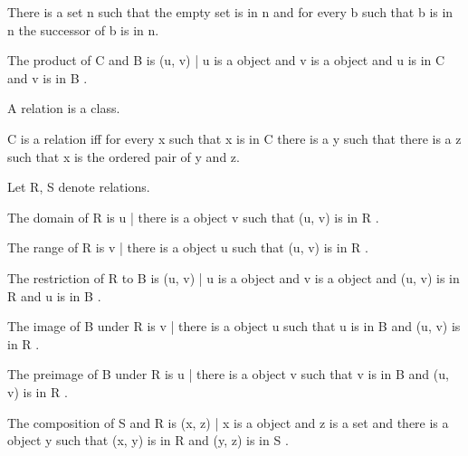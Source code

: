 \documentclass{article}
\begin{document}
\begin{forthel}
    \begin{axiom}[Inf]
      There is a set n such that the empty set is in n and for every b
        such that b is in n the successor of b is in n.
    \end{axiom}

    \begin{definition}
      The product of C and B is { (u, v) | u is a object and v is a object and u is in C and v is in B }.
    \end{definition}

    \begin{signature}
      A relation is a class.
    \end{signature}

    \begin{axiom}[RelationIntro]
      C is a relation iff for every x such that x is in C
        there is a y such that there is a z such that x is the ordered pair of y and z.
    \end{axiom}

    Let R, S denote relations.

    \begin{definition} 
      The domain of R is { u | there is a object v such that (u, v) is in R }.
    \end{definition}

    \begin{definition} 
      The range of R is { v | there is a object u such that (u, v) is in R }.
    \end{definition}

    \begin{definition} 
      The restriction of R to B is { (u, v) | u is a object and v is a object and (u, v) is in R and u is in B }.
    \end{definition}

    \begin{definition} 
      The image of B under R is { v | there is a object u such that u is in B and (u, v) is in R }.
    \end{definition}

    \begin{definition} 
      The preimage of B under R is { u | there is a object v such that v is in B and (u, v) is in R }.
    \end{definition}

    \begin{definition} 
      The composition of S and R is { (x, z) | x is a object and z is a set and there is a object y such that (x, y) is in R and (y, z) is in S }.
    \end{definition}


\end{forthel}
\end{document}
